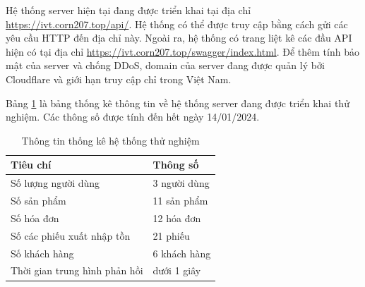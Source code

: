 \documentclass[../DoAn.tex]{subfiles}
\begin{document}
Hệ thống server hiện tại đang được triển khai tại địa chỉ \color{blue}\url{https://ivt.corn207.top/api/}\color{black}. Hệ thống có thể được truy cập bằng cách gửi các yêu cầu HTTP đến địa chỉ này. Ngoài ra, hệ thống có trang liệt kê các đầu API hiện có tại địa chỉ \color{blue}\url{https://ivt.corn207.top/swagger/index.html}\color{black}. Để thêm tính bảo mật của server và chống DDoS, domain của server đang được quản lý bởi Cloudflare và giới hạn truy cập chỉ trong Việt Nam.
\vfill
\break

Bảng \ref{table:deployment-statistics} là bảng thống kê thông tin về hệ thống server đang được triển khai thử nghiệm. Các thông số được tính đến hết ngày 14/01/2024.
\begin{table}[H]
    \begin{tabularx}{\textwidth}{|l|X|}
        \hline
        \textbf{Tiêu chí}             & \textbf{Thông số} \\ \hline
        Số lượng người dùng           & 3 người dùng      \\ \hline
        Số sản phẩm                   & 11 sản phẩm       \\ \hline
        Số hóa đơn                    & 12 hóa đơn        \\ \hline
        Số các phiếu xuất nhập tồn    & 21 phiếu          \\ \hline
        Số khách hàng                 & 6 khách hàng      \\ \hline
        Thời gian trung hình phản hồi & dưới 1 giây       \\ \hline
    \end{tabularx}
    \caption{Thông tin thống kê hệ thống thử nghiệm}
    \label{table:deployment-statistics}
\end{table}
\end{document}
